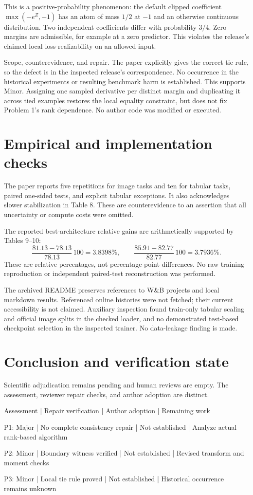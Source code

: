 \documentclass[10pt]{article}
\begin{document}
This is a positive-probability phenomenon: the default clipped coefficient \(\max(-e^Z,-1)\) has an atom of mass \(1/2\) at \(-1\) and an otherwise continuous distribution. Two independent coefficients differ with probability \(3/4\). Zero margins are admissible, for example at a zero predictor. This violates the release’s claimed local loss-realizability on an allowed input.\par
Scope, counterevidence, and repair. The paper explicitly gives the correct tie rule, so the defect is in the inspected release’s correspondence. No occurrence in the historical experiments or resulting benchmark harm is established. This supports Minor. Assigning one sampled derivative per distinct margin and duplicating it across tied examples restores the local equality constraint, but does not fix Problem 1’s rank dependence. No author code was modified or executed.\par
\section*{Empirical and implementation checks}
The paper reports five repetitions for image tasks and ten for tabular tasks, paired one-sided tests, and explicit tabular exceptions. It also acknowledges slower stabilization in Table 8. These are counterevidence to an assertion that all uncertainty or compute costs were omitted.\par
The reported best-architecture relative gains are arithmetically supported by Tables 9–10: \[\frac{81.13-78.13}{78.13}\,100=3.8398\%,\qquad
 \frac{85.91-82.77}{82.77}\,100=3.7936\%.\] These are relative percentages, not percentage-point differences. No raw training reproduction or independent paired-test reconstruction was performed.\par
The archived README preserves references to W\&B projects and local markdown results. Referenced online histories were not fetched; their current accessibility is not claimed. Auxiliary inspection found train-only tabular scaling and official image splits in the checked loader, and no demonstrated test-based checkpoint selection in the inspected trainer. No data-leakage finding is made.\par
\section*{Conclusion and verification state}
Scientific adjudication remains pending and human reviews are empty. The assessment, reviewer repair checks, and author adoption are distinct.\par
Assessment | Repair verification | Author adoption | Remaining work\par
P1: Major | No complete consistency repair | Not established | Analyze actual rank-based algorithm\par
P2: Minor | Boundary witness verified | Not established | Revised transform and moment checks\par
P3: Minor | Local tie rule proved | Not established | Historical occurrence remains unknown\par
\end{document}
